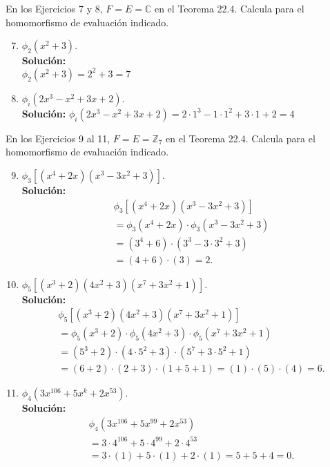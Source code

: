 En los Ejercicios 7 y 8, $F = E = \mathbb{C}$ en el Teorema 22.4. Calcula para el homomorfismo de evaluación indicado.
\begin{enumerate}
	\setcounter{enumi}{6}
	\item $\phi_2(x^2 + 3) $.
	\\ \textbf{Solución:} \\
	$\phi_2(x^2 + 3) = 2^2 + 3 = 7$
	\item $\phi_i(2x^3 - x^2 + 3x + 2)$.
	\\ \textbf{Solución:}
	$\phi_i(2x^3 - x^2 + 3x + 2) = 2 \cdot 1^3 - 1 \cdot 1^2 + 3 \cdot 1 + 2 = 4$
\end{enumerate}
\noindent
En los Ejercicios 9 al 11, $F = E = \mathbb{Z}_7$ en el Teorema 22.4. Calcula para el homomorfismo de evaluación indicado.
\begin{enumerate}
	\setcounter{enumi}{8}
	\item $\phi_3[(x^4 + 2x)(x^3 - 3x^2 + 3)]$.
	\\ \textbf{Solución:} 
	\begin{align*}
		& \phi_3[(x^4 + 2x)(x^3 - 3x^2 + 3)] \\
		& = \phi_3(x^4 + 2x) \cdot \phi_3(x^3 - 3x^2 + 3) \\
		& = (3^4 + 6) \cdot (3^3 - 3 \cdot 3^2 + 3) \\
		& = (4 + 6) \cdot (3) = 2.
	\end{align*}
	\item $\phi_5[(x^3 + 2)(4x^2 + 3)(x^7 + 3x^2 + 1)]$.
	\\ \textbf{Solución:} 
	\begin{align*}
		&  \phi_5[(x^3 + 2)(4x^2 + 3)(x^7 + 3x^2 + 1)] \\
		&= \phi_5(x^3 + 2) \cdot \phi_5(4x^2 + 3) \cdot \phi_5(x^7 + 3x^2 + 1) \\
		& = (5^3 + 2) \cdot (4 \cdot 5^2 + 3) \cdot (5^7 + 3 \cdot 5^2 + 1) \\
		& = (6 + 2) \cdot (2 + 3) \cdot (1 + 5 + 1) = (1) \cdot (5) \cdot (4) = 6.
	\end{align*}
	\item $\phi_4(3x^{106} + 5x^k + 2x^{53})$.
	\\ \textbf{Solución:}
	\begin{align*}
		&\phi_4(3x^{106} + 5x^{99} + 2x^{53}) \\
		&= 3 \cdot 4^{106} + 5 \cdot 4^{99} + 2 \cdot 4^{53} \\
		&= 3 \cdot (1) + 5 \cdot (1) + 2 \cdot (1) = 5 + 5 + 4 = 0.
	\end{align*}
\end{enumerate}
